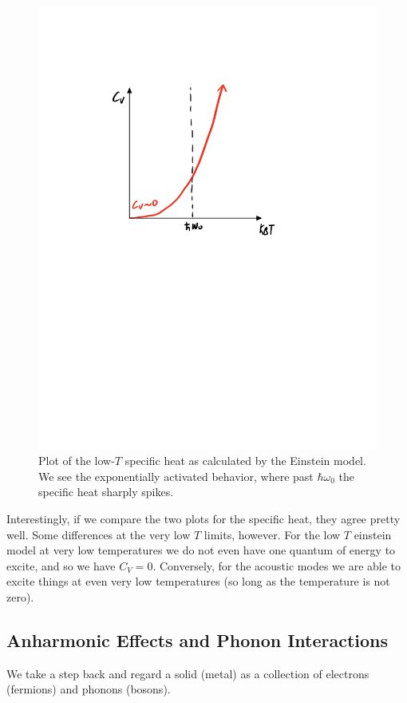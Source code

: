 \begin{figure}[htbp]
    \centering
    \includegraphics[scale=0.7]{Images/fig-einsteinmodelspecificheat.pdf}
    \caption{Plot of the low-$T$ specific heat as calculated by the Einstein model. We see the exponentially activated behavior, where past $\hbar\omega_0$ the specific heat sharply spikes.}
    \label{fig-einsteinmodelspecificheat}
\end{figure}

Interestingly, if we compare the two plots for the specific heat, they agree pretty well. Some differences at the very low $T$ limits, however. For the low $T$ einstein model at very low temperatures we do not even have one quantum of energy to excite, and so we have $C_V = 0$. Conversely, for the acoustic modes we are able to excite things at even very low temperatures (so long as the temperature is not zero).

\subsection{Anharmonic Effects and Phonon Interactions}
We take a step back and regard a solid (metal) as a collection of electrons (fermions) and phonons (bosons).


